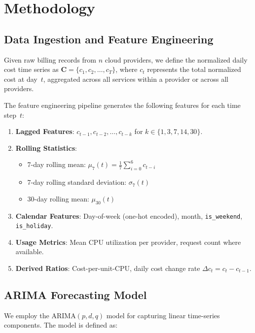 \documentclass[conference]{IEEEtran}
\begin{document}
\section{Methodology}
\label{sec:methodology}

\subsection{Data Ingestion and Feature Engineering}

Given raw billing records from $n$ cloud providers, we define the normalized daily cost time series as $\mathbf{C} = \{c_1, c_2, \ldots, c_T\}$, where $c_t$ represents the total normalized cost at day~$t$, aggregated across all services within a provider or across all providers.

The feature engineering pipeline generates the following features for each time step~$t$:

\begin{enumerate}
    \item \textbf{Lagged Features}: $c_{t-1}, c_{t-2}, \ldots, c_{t-k}$ for $k \in \{1, 3, 7, 14, 30\}$.
    \item \textbf{Rolling Statistics}:
    \begin{itemize}
        \item 7-day rolling mean: $\mu_7(t) = \frac{1}{7}\sum_{i=0}^{6} c_{t-i}$
        \item 7-day rolling standard deviation: $\sigma_7(t)$
        \item 30-day rolling mean: $\mu_{30}(t)$
    \end{itemize}
    \item \textbf{Calendar Features}: Day-of-week (one-hot encoded), month, \texttt{is\_weekend}, \texttt{is\_holiday}.
    \item \textbf{Usage Metrics}: Mean CPU utilization per provider, request count where available.
    \item \textbf{Derived Ratios}: Cost-per-unit-CPU, daily cost change rate $\Delta c_t = c_t - c_{t-1}$.
\end{enumerate}

\subsection{ARIMA Forecasting Model}

We employ the ARIMA$(p,d,q)$ model for capturing linear time-series components. The model is defined as:
\end{document}
